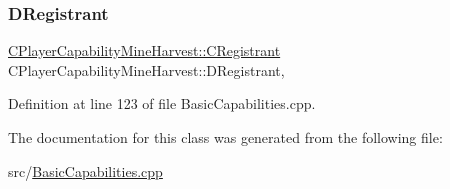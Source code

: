 \subsubsection{\texorpdfstring{D\+Registrant}{DRegistrant}}
{\footnotesize\ttfamily \hyperlink{classCPlayerCapabilityMineHarvest_1_1CRegistrant}{C\+Player\+Capability\+Mine\+Harvest\+::\+C\+Registrant} C\+Player\+Capability\+Mine\+Harvest\+::\+D\+Registrant\hspace{0.3cm}{\ttfamily [static]}, {\ttfamily [protected]}}



Definition at line 123 of file Basic\+Capabilities.\+cpp.



The documentation for this class was generated from the following file\+:\begin{DoxyCompactItemize}
\item 
src/\hyperlink{BasicCapabilities_8cpp}{Basic\+Capabilities.\+cpp}\end{DoxyCompactItemize}
